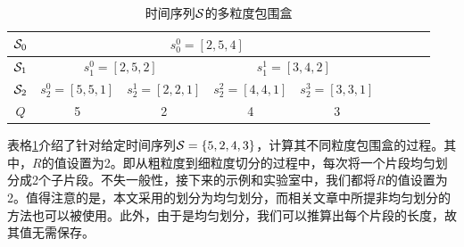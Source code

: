 \begin{table}
	\centering  
	\renewcommand\arraystretch{1.2}
	\begin{tabular}{|c|c|c|c|c|c|c|c|c|} 
		\hline
		${\cal S}_{0}$ &  \multicolumn{4}{|c|}{$s_{0}^{0}={[2,5,4]}$} \\ \hline
		${\cal S}_{1}$ & \multicolumn{2}{|c|}{$s_{1}^{0}={[2,5,2]}$} & \multicolumn{2}{|c|}{$s_{1}^{1}={[3,4,2]}$} \\ \hline 
		${\cal S}_{2}$ & \multicolumn{1}{|c|}{$s_{2}^{0}={[5,5,1]}$} & \multicolumn{1}{|c|}{$s_{2}^{1}={[2,2,1]}$} &
		\multicolumn{1}{|c|}{$s_{2}^{2}={[4,4,1]}$} &  \multicolumn{1}{|c|}{$s_{2}^{3}={[3,3,1]}$} \\ \hline 
		$Q$ & 5 & 2 & 4 & 3
		\\ \hline
	\end{tabular}
	\caption{时间序列$\cal S$的多粒度包围盒}
	\label{table:BE}
\end{table}
表格\ref{table:BE}介绍了针对给定时间序列${\cal S}=\{5,2,4,3\}$，计算其不同粒度包围盒的过程。其中，$R$的值设置为2。即从粗粒度到细粒度切分的过程中，每次将一个片段均匀划分成2个子片段。不失一般性，接下来的示例和实验室中，我们都将$R$的值设置为2。值得注意的是，本文采用的划分为均匀划分，而相关文章中所提非均匀划分的方法也可以被使用。此外，由于是均匀划分，我们可以推算出每个片段的长度，故其值无需保存。
 

%
%

%
 
